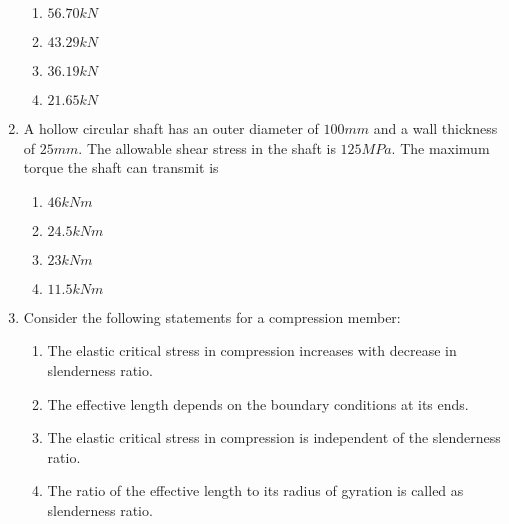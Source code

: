 \documentclass[journal]{IEEEtran}
\begin{document}
\begin{enumerate}[start=25]
\begin{figure}[!ht]
\label{fig:my_label}
\end{figure}
\begin{enumerate}
    \item $56.70 kN$
    \item $43.29 kN$
    \item $36.19 kN$
    \item $21.65 kN$
\end{enumerate}
\item  A hollow circular shaft has an outer diameter of $100 mm$ and a wall thickness of $25 mm$. The allowable shear stress in the shaft is $125 MPa$. The maximum torque the shaft can transmit is
\begin{enumerate}
    \item $46 kN m$
    \item $24.5 kN m$
    \item $23 kN m$
    \item $11.5 kN m$
\end{enumerate}
\item Consider the following statements for a compression member:
\begin{enumerate}
    \item The elastic critical stress in compression increases with decrease in slenderness ratio.
    \item The effective length depends on the boundary conditions at its ends.
    \item The elastic critical stress in compression is independent of the slenderness ratio.
    \item The ratio of the effective length to its radius of gyration is called as slenderness ratio.
\end{enumerate}


\end{enumerate}
\end{document}
